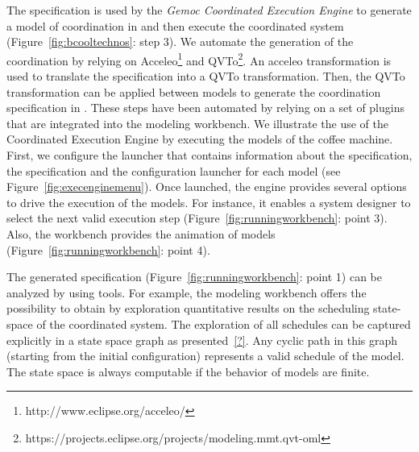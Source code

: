 The \bflow specification is used by the \emph{Gemoc Coordinated Execution Engine} to generate a model of coordination in \ccsl and then execute the coordinated system (Figure~\ref{fig:bcooltechnos}: step 3). We automate the generation of the coordination by relying on Acceleo\footnote{http://www.eclipse.org/acceleo/} and QVTo\footnote{https://projects.eclipse.org/projects/modeling.mmt.qvt-oml}. An acceleo transformation is used to translate the \bcool specification into a QVTo transformation. Then, the QVTo transformation can be applied between models to generate the coordination specification in \ccsl. These steps have been automated by relying on a set of plugins that are integrated into the modeling workbench. We illustrate the use of the Coordinated Execution Engine by executing the models of the coffee machine. First, we configure the launcher that contains information about the \bcool specification, the \bflow specification and the configuration launcher for each model (see Figure~\ref{fig:execenginemenu}). Once launched, the engine provides several options to drive the execution of the models. For instance, it enables a system designer to select the next valid execution step (Figure~\ref{fig:runningworkbench}: point 3). Also, the workbench provides the animation of models (Figure~\ref{fig:runningworkbench}: point 4). 

The generated \ccsl specification (Figure~\ref{fig:runningworkbench}: point 1) can be analyzed by using \ccsl tools. For example, the modeling workbench offers the possibility to obtain by exploration quantitative results on the scheduling state-space of the coordinated system. The exploration of all schedules can be captured explicitly in a state space graph as presented~\ref{?}. Any cyclic path in this graph (starting from the initial configuration) represents a valid schedule of the model. The state space is always computable if the behavior of models are finite.

